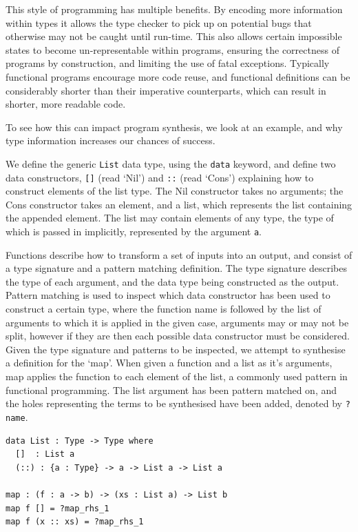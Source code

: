 \documentclass[a4paper]{article}
\begin{document}
This style of programming has multiple benefits. By encoding more 
information within types it allows the type checker to pick up on 
potential bugs that otherwise may not be caught until run-time. This
also allows certain impossible states to become un-representable within
programs, ensuring the correctness of programs by construction, and limiting the use of fatal exceptions. Typically functional programs
encourage more code reuse, and functional definitions can be
considerably shorter than their imperative counterparts, which can
result in shorter, more readable code.

To see how this can impact program synthesis, we look at an example, 
and why type information increases our chances of success. 

We define the generic \texttt{List} data type, using the \texttt{data}
keyword, and define two data constructors, \texttt{[]} (read `Nil') and \texttt{::} (read `Cons')
explaining how to construct elements of the list type. The Nil constructor takes no arguments; the Cons constructor takes an element, and
a list, which represents the list containing the appended element.
The list may contain elements of any type, the type of which is
passed in implicitly, represented by the argument \texttt{a}.

Functions describe how to transform a set of inputs into an output, and
consist of a type signature and a pattern matching definition. The type
signature describes the type of each argument,
and the data type being constructed as the output. Pattern matching is used to inspect
which data constructor has been used to construct a certain type, where the function name
is followed by the list of arguments to which it is applied in the given case, arguments
may or may not be split, however if they are then each possible data constructor must be 
considered.
Given the type signature and patterns to be inspected, we attempt to
synthesise a definition for the `map'. When given a function and
a list as it's arguments, map applies the function to each element of
the list, a commonly used pattern in functional programming. The list
argument has been pattern matched on, and the holes representing the
terms to be synthesised
have been added, denoted by \texttt{?name}.

\begin{center}
\begin{verbatim}
data List : Type -> Type where
  []  : List a
  (::) : {a : Type} -> a -> List a -> List a

map : (f : a -> b) -> (xs : List a) -> List b 
map f [] = ?map_rhs_1
map f (x :: xs) = ?map_rhs_1
\end{verbatim}
\end{center}
\end{document}
